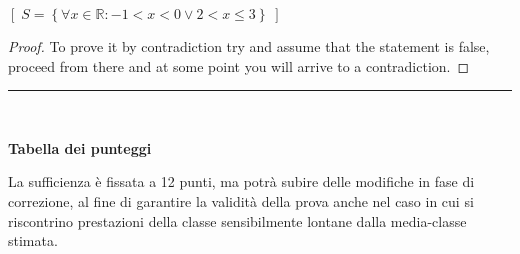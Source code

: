 \documentclass[11pt, a4paper]{exam}
\makeatletter
\newenvironment{sistema}%
{\left\lbrace\begin{array}{@{}l@{}}}%
{\end{array}\right.}
\makeatother
\begin{document}
\begin{questions}
%

%


%
%

{\footnotesize
\begin{solution}	
	\( \left[\; S = \left\{ \forall x \in \mathbb{R}: -1 < x < 0 \vee 2 < x \le 3 \right\} \; \right] \) 
\end{solution}
}

\begin{proof}
To prove it by contradiction try and assume that the statement is false,
proceed from there and at some point you will arrive to a contradiction.
\end{proof}
\end{questions}
\vfill
\rule[2ex]{\textwidth}{1pt}\\
\begin{center}
{\bf Tabella dei punteggi}
\vspace{10pt}

\combinedgradetable[h][questions]
\end{center}
\vspace{4pt}
\footnotesize La sufficienza è fissata a 12 punti, ma potrà subire delle modifiche in fase di correzione, al fine di garantire la validità della prova anche nel caso in cui si riscontrino prestazioni della classe sensibilmente lontane dalla media-classe stimata.
\end{document}
